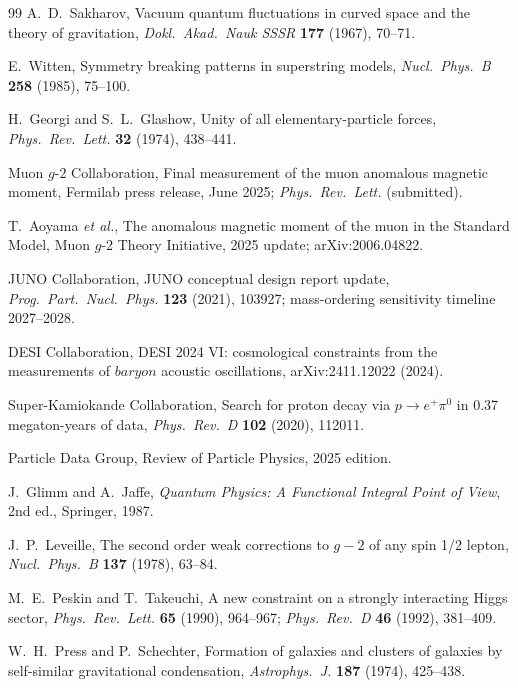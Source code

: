 \documentclass[11pt]{article}
\theoremstyle{plain}
\theoremstyle{definition}
\theoremstyle{remark}
\numberwithin{equation}{section}
\begin{document}
\begin{thebibliography}{99}
A.~D.~Sakharov,
Vacuum quantum fluctuations in curved space and the theory of gravitation,
\emph{Dokl.\ Akad.\ Nauk SSSR} \textbf{177} (1967), 70--71.

E.~Witten,
Symmetry breaking patterns in superstring models,
\emph{Nucl.\ Phys.\ B} \textbf{258} (1985), 75--100.

H.~Georgi and S.~L.~Glashow,
Unity of all elementary-particle forces,
\emph{Phys.\ Rev.\ Lett.} \textbf{32} (1974), 438--441.

Muon $g$-2 Collaboration,
Final measurement of the muon anomalous magnetic moment,
Fermilab press release, June 2025;
\emph{Phys.\ Rev.\ Lett.} (submitted).

T.~Aoyama \emph{et al.},
The anomalous magnetic moment of the muon in the Standard Model,
Muon $g$-2 Theory Initiative, 2025 update;
arXiv:2006.04822.

JUNO Collaboration,
JUNO conceptual design report update,
\emph{Prog.\ Part.\ Nucl.\ Phys.} \textbf{123} (2021), 103927;
mass-ordering sensitivity timeline 2027--2028.

DESI Collaboration,
DESI 2024 VI: cosmological constraints from the measurements of
$baryon$ acoustic oscillations,
arXiv:2411.12022 (2024).

Super-Kamiokande Collaboration,
Search for proton decay via $p\to e^+\pi^0$ in 0.37 megaton-years of data,
\emph{Phys.\ Rev.\ D} \textbf{102} (2020), 112011.

Particle Data Group,
Review of Particle Physics, 2025 edition.

J.~Glimm and A.~Jaffe,
\emph{Quantum Physics: A Functional Integral Point of View},
2nd ed., Springer, 1987.

J.~P.~Leveille,
The second order weak corrections to $g-2$ of any spin 1/2 lepton,
\emph{Nucl.\ Phys.\ B} \textbf{137} (1978), 63--84.

M.~E.~Peskin and T.~Takeuchi,
A new constraint on a strongly interacting Higgs sector,
\emph{Phys.\ Rev.\ Lett.} \textbf{65} (1990), 964--967;
\emph{Phys.\ Rev.\ D} \textbf{46} (1992), 381--409.

W.~H.~Press and P.~Schechter,
Formation of galaxies and clusters of galaxies by self-similar gravitational
condensation,
\emph{Astrophys.\ J.} \textbf{187} (1974), 425--438.

\end{thebibliography}
\end{document}
